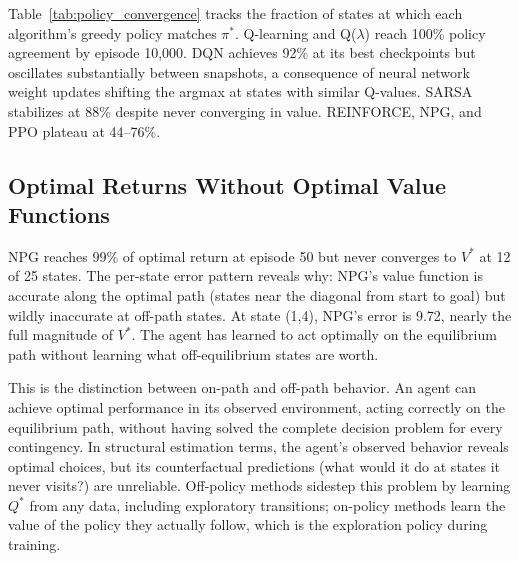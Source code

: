 \begin{table}[ht]
\centering
\caption{Maximum per-state value error $\max_s |V(s) - V^*(s)|$ over episodes (rolling average over $\pm 3$ snapshots). Off-policy methods converge uniformly; on-policy methods plateau at persistent errors driven by rarely-visited states.}
\label{tab:value_convergence}
\footnotesize

\end{table}

Table~\ref{tab:policy_convergence} tracks the fraction of states at which each algorithm's greedy policy matches $\pi^*$. Q-learning and Q($\lambda$) reach 100\% policy agreement by episode 10,000. DQN achieves 92\% at its best checkpoints but oscillates substantially between snapshots, a consequence of neural network weight updates shifting the argmax at states with similar Q-values. SARSA stabilizes at 88\% despite never converging in value. REINFORCE, NPG, and PPO plateau at 44--76\%.

\begin{table}[ht]
\centering
\caption{Policy agreement $(\%$ of states where $\pi(s) = \pi^*(s))$ over episodes (rolling average over $\pm 3$ snapshots). Tabular off-policy methods reach full agreement. DQN's average is depressed by inter-snapshot oscillation. Policy gradient methods plateau below 80\%.}
\label{tab:policy_convergence}
\footnotesize

\end{table}


\subsection{Optimal Returns Without Optimal Value Functions}
\label{sec:illustrated_agreement}

NPG reaches 99\% of optimal return at episode 50 but never converges to $V^*$ at 12 of 25 states. The per-state error pattern reveals why: NPG's value function is accurate along the optimal path (states near the diagonal from start to goal) but wildly inaccurate at off-path states. At state (1,4), NPG's error is 9.72, nearly the full magnitude of $V^*$. The agent has learned to act optimally on the equilibrium path without learning what off-equilibrium states are worth.

This is the distinction between on-path and off-path behavior. An agent can achieve optimal performance in its observed environment, acting correctly on the equilibrium path, without having solved the complete decision problem for every contingency. In structural estimation terms, the agent's observed behavior reveals optimal choices, but its counterfactual predictions (what would it do at states it never visits?) are unreliable. Off-policy methods sidestep this problem by learning $Q^*$ from any data, including exploratory transitions; on-policy methods learn the value of the policy they actually follow, which is the exploration policy during training.

